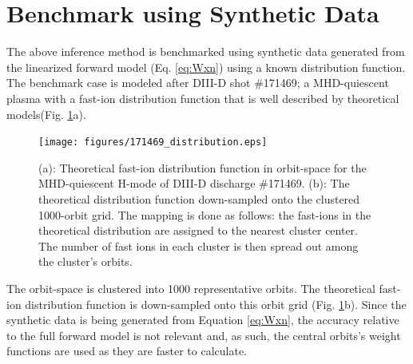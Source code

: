\section{Benchmark using Synthetic Data}
The above inference method is benchmarked using synthetic data generated from the linearized forward model (Eq. \ref{eq:Wxn}) using a known distribution function. 
The benchmark case is modeled after DIII-D shot \#171469; a MHD-quiescent plasma with a fast-ion distribution function that is well described by theoretical models(Fig. \ref{fig:171469_distribution}a).
\begin{figure}[h!]
    \centering
    \texttt{[image: figures/171469\_distribution.eps]}
    \caption{(a): Theoretical fast-ion distribution function in orbit-space for the MHD-quiescent H-mode of DIII-D discharge \#171469. (b): The theoretical distribution function down-sampled onto the clustered 1000-orbit grid. The mapping is done as follows: the fast-ions in the theoretical distribution are assigned to the nearest cluster center. The number of fast ions in each cluster is then spread out among the cluster's orbits.}
    \label{fig:171469_distribution}
\end{figure}
The orbit-space is clustered into 1000 representative orbits. The theoretical fast-ion distribution function is down-sampled onto this orbit grid (Fig. \ref{fig:171469_distribution}b). Since the synthetic data is being generated from Equation \ref{eq:Wxn}, the accuracy relative to the full forward model is not relevant and, as such, the central orbits's weight functions are used as they are faster to calculate. 

